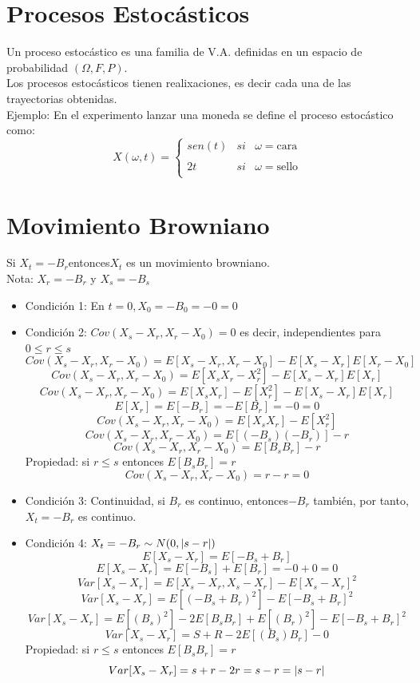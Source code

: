 \documentclass[11pt,fleqn]{book} %
\numberwithin{equation}{section} %
\numberwithin{figure}{section} %
\numberwithin{table}{section} %
\begin{document}
\section{Procesos Estocásticos}
Un proceso estocástico es una familia de V.A. definidas en un espacio de probabilidad $(\Omega,F,P)$.
\ \\%
Los procesos estocásticos tienen realixaciones, es decir cada una de las trayectorias obtenidas.
\ \\%
Ejemplo: En el experimento lanzar una moneda se define el proceso estocástico como:
$$X(\omega, t)= \left\{ \begin{array}{lcc}
             sen(t) &   si  & \omega = \text{cara} \\
             \\ 2t &  si & \omega = \text{sello} \\
               \end{array}
   \right.$$
\section{Movimiento Browniano}
Si $X_{t}=-B_{r}$\:entonces\:$X_{t}$ es un movimiento browniano.
\ \\%
Nota: $X_{r}=-B_{r}$ y $X_{s}=-B_{s}$
\begin{itemize}
    \item Condición 1: En $t=0, X_{0}=-B_{0}=-0=0$  
    \item Condición 2: $Cov(X_{s}-X_{r},X_{r}-X_{0})=0$ es decir, independientes para $0 \leq r \leq s $
    $$Cov(X_{s}-X_{r},X_{r}-X_{0})=E[X_{s}-X_{r},X_{r}-X_{0}]-E[X_{s}-X_{r}]E[X_{r}-X_{0}]$$
    $$Cov(X_{s}-X_{r},X_{r}-X_{0})=E[X_{s}X_{r}-X_{r}^2]-E[X_{s}-X_{r}]E[X_{r}]$$
    $$Cov(X_{s}-X_{r},X_{r}-X_{0})=E[X_{s}X_{r}]-E[X_{r}^2]-E[X_{s}-X_{r}]E[X_{r}]$$
    $$E[X_{r}]=E[-B_{r}]=-E[B_{r}]=-0=0$$
    $$Cov(X_{s}-X_{r},X_{r}-X_{0})=E[X_{s}X_{r}]-E[X_{r}^2]$$
    $$Cov(X_{s}-X_{r},X_{r}-X_{0})=E[(-B_{s})(-B_{r})]-r$$
    $$Cov(X_{s}-X_{r},X_{r}-X_{0})=E[B_{s}B_{r}]-r$$
    Propiedad: si $r \leq s$ entonces $E\left[B_{s}B_{r}\right] = r$
    $$Cov(X_{s}-X_{r},X_{r}-X_{0})=r-r = 0$$
    \item Condición 3: Continuidad, si $B_{r}$ es continuo, entonces$-B_{r}$ también, por tanto,$X_{t}=-B_{r}$ es continuo.
    \item Condición 4: $X_{t}=-B_{r} \sim N(0,\arrowvert
    s-r\arrowvert)$
    $$E[X_{s}-X_{r}]=E[-B_{s}+B_{r}]$$
    $$E[X_{s}-X_{r}]=E[-B_{s}]+E[B_{r}] = -0+0=0$$
    $$Var[X_{s}-X_{r}]=E[X_{s}-X_{r},X_{s}-X_{r}]-E[X_{s}-X_{r}]^2$$
    $$Var[X_{s}-X_{r}]=E[(-B_{s}+B_{r})^2]-E[-B_{s}+B_{r}]^2$$
    $$Var[X_{s}-X_{r}]=E[(B_{s})^2]-2E[B_{s}B_{r}]+E[(B_{r})^2]-E[-B_{s}+B_{r}]^2$$
    $$Var[X_{s}-X_{r}]=S+R-2E[(B_{s})B_{r}]-0$$
    Propiedad: si $r \leq s$ entonces $E[B_{s}B_{r}]=r$
    $$Var[X_{s}-X_{r}]=s+r-2r = s-r = \arrowvert s-r\arrowvert$$
\end{itemize}
\end{document}
